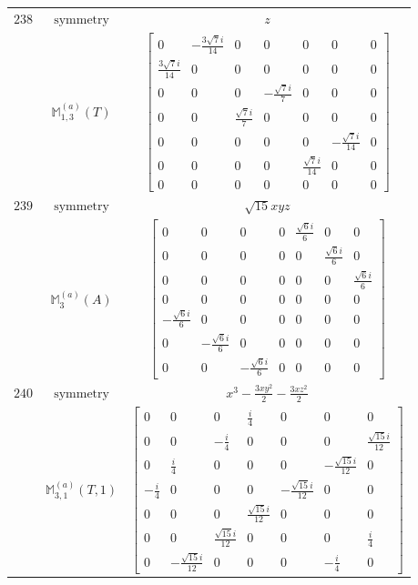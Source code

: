 \documentclass[fleqn,8pt,landscape]{jsarticle}
\begin{document}
\begin{longtable}{ccc}
$ 238 $ & $ \text{symmetry} $ & $ z $ \\
$  $ & $ \mathbb{M}_{1,3}^{(a)}(T) $ & $ \begin{bmatrix} 0 & - \frac{3 \sqrt{7} i}{14} & 0 & 0 & 0 & 0 & 0 \\ \frac{3 \sqrt{7} i}{14} & 0 & 0 & 0 & 0 & 0 & 0 \\ 0 & 0 & 0 & - \frac{\sqrt{7} i}{7} & 0 & 0 & 0 \\ 0 & 0 & \frac{\sqrt{7} i}{7} & 0 & 0 & 0 & 0 \\ 0 & 0 & 0 & 0 & 0 & - \frac{\sqrt{7} i}{14} & 0 \\ 0 & 0 & 0 & 0 & \frac{\sqrt{7} i}{14} & 0 & 0 \\ 0 & 0 & 0 & 0 & 0 & 0 & 0 \end{bmatrix} $ \\ \hline
$ 239 $ & $ \text{symmetry} $ & $ \sqrt{15} x y z $ \\
$  $ & $ \mathbb{M}_{3}^{(a)}(A) $ & $ \begin{bmatrix} 0 & 0 & 0 & 0 & \frac{\sqrt{6} i}{6} & 0 & 0 \\ 0 & 0 & 0 & 0 & 0 & \frac{\sqrt{6} i}{6} & 0 \\ 0 & 0 & 0 & 0 & 0 & 0 & \frac{\sqrt{6} i}{6} \\ 0 & 0 & 0 & 0 & 0 & 0 & 0 \\ - \frac{\sqrt{6} i}{6} & 0 & 0 & 0 & 0 & 0 & 0 \\ 0 & - \frac{\sqrt{6} i}{6} & 0 & 0 & 0 & 0 & 0 \\ 0 & 0 & - \frac{\sqrt{6} i}{6} & 0 & 0 & 0 & 0 \end{bmatrix} $ \\ \hline
$ 240 $ & $ \text{symmetry} $ & $ x^{3} - \frac{3 x y^{2}}{2} - \frac{3 x z^{2}}{2} $ \\
$  $ & $ \mathbb{M}_{3,1}^{(a)}(T,1) $ & $ \begin{bmatrix} 0 & 0 & 0 & \frac{i}{4} & 0 & 0 & 0 \\ 0 & 0 & - \frac{i}{4} & 0 & 0 & 0 & \frac{\sqrt{15} i}{12} \\ 0 & \frac{i}{4} & 0 & 0 & 0 & - \frac{\sqrt{15} i}{12} & 0 \\ - \frac{i}{4} & 0 & 0 & 0 & - \frac{\sqrt{15} i}{12} & 0 & 0 \\ 0 & 0 & 0 & \frac{\sqrt{15} i}{12} & 0 & 0 & 0 \\ 0 & 0 & \frac{\sqrt{15} i}{12} & 0 & 0 & 0 & \frac{i}{4} \\ 0 & - \frac{\sqrt{15} i}{12} & 0 & 0 & 0 & - \frac{i}{4} & 0 \end{bmatrix} $ \\ \hline

\end{longtable}
\end{document}
